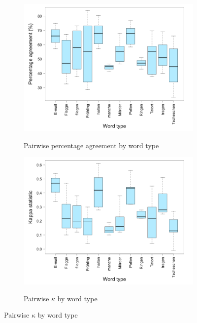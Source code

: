 		
		\begin{figure}[phtb]
			\centering
			
%			

					
			
			\begin{subfigure}{\textwidth}
				\centering
				\caption{Pairwise percentage agreement by word type}
				\includegraphics[width=.9\textwidth]{img/plots/pairwisePctByWord-noTitle}
				\label{fig:agreement:words:pct}
			\end{subfigure}%
			
			\vspace{2em}
			
			\begin{subfigure}{\textwidth}
				\centering
				\caption{Pairwise $\kappa$ by word type}
				\includegraphics[width=.9\textwidth]{img/plots/pairwiseKappaByWord-noTitle}
				\label{fig:agreement:words:k}
			\end{subfigure}%
			

\end{figure}
